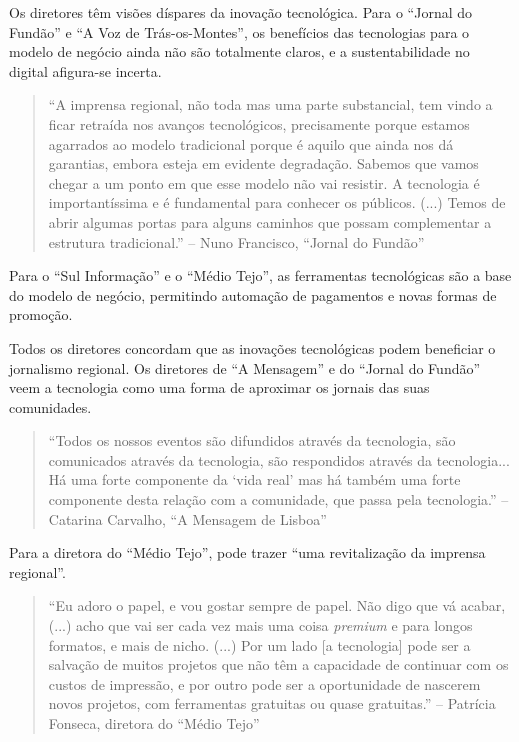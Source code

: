\documentclass[portuguese]{textolivre}
\begin{document}
Os diretores têm visões díspares da inovação tecnológica. Para o
``Jornal do Fundão'' e ``A Voz de Trás-os-Montes'', os benefícios das
tecnologias para o modelo de negócio ainda não são totalmente claros, e
a sustentabilidade no digital afigura-se incerta.

\begin{quote}
``A imprensa regional, não toda mas uma parte substancial, tem vindo a
ficar retraída nos avanços tecnológicos, precisamente porque estamos
agarrados ao modelo tradicional porque é aquilo que ainda nos dá
garantias, embora esteja em evidente degradação. Sabemos que vamos
chegar a um ponto em que esse modelo não vai resistir. A tecnologia é
importantíssima e é fundamental para conhecer os públicos. (...) Temos
de abrir algumas portas para alguns caminhos que possam complementar a
estrutura tradicional.'' -- Nuno Francisco, ``Jornal do Fundão''
\end{quote}

Para o ``Sul Informação'' e o ``Médio Tejo'', as ferramentas
tecnológicas são a base do modelo de negócio, permitindo automação de
pagamentos e novas formas de promoção.

Todos os diretores concordam que as inovações tecnológicas podem
beneficiar o jornalismo regional. Os diretores de ``A Mensagem'' e do
``Jornal do Fundão'' veem a tecnologia como uma forma de aproximar os
jornais das suas comunidades.

\begin{quote}
``Todos os nossos eventos são difundidos através da tecnologia, são
comunicados através da tecnologia, são respondidos através da
tecnologia... Há uma forte componente da `vida real' mas há também uma
forte componente desta relação com a comunidade, que passa pela
tecnologia.'' -- Catarina Carvalho, ``A Mensagem de Lisboa''
\end{quote}

Para a diretora do ``Médio Tejo'', pode trazer ``uma revitalização da
imprensa regional''.

\begin{quote}
``Eu adoro o papel, e vou gostar sempre de papel. Não digo que vá
acabar, (...) acho que vai ser cada vez mais uma coisa \emph{premium} e
para longos formatos, e mais de nicho. (...) Por um lado {[}a
tecnologia{]} pode ser a salvação de muitos projetos que não têm a
capacidade de continuar com os custos de impressão, e por outro pode ser
a oportunidade de nascerem novos projetos, com ferramentas gratuitas ou
quase gratuitas.'' -- Patrícia Fonseca, diretora do ``Médio Tejo''
\end{quote}
\end{document}
